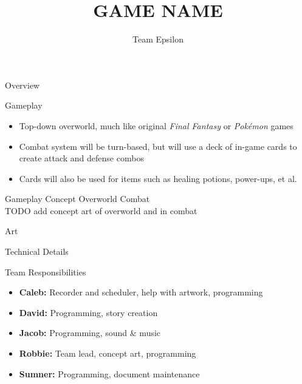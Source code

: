 \documentclass{teamepsilon}
\title{GAME NAME}
\author{Team Epsilon}
\institute{Colorado School of Mines}
\begin{document}
\begin{frame}{Overview}

\end{frame}

\begin{frame}{Gameplay}
    \begin{itemize}
        \item Top-down overworld, much like original \textit{Final Fantasy}
        or \textit{Pok\'emon} games
        \item Combat system will be turn-based, but will use a deck of in-game
        cards to create attack and defense combos
        \item Cards will also be used for items such as healing potions,
        power-ups, et al.
    \end{itemize}
\end{frame}

\begin{frame}{Gameplay Concept}
Overworld \hfill Combat \\
TODO add concept art of overworld and in combat
\end{frame}

\begin{frame}{Art}

\end{frame}

\begin{frame}{Technical Details}

\end{frame}

\begin{frame}{Team Responsibilities}
    \begin{itemize}
        \item \textbf{Caleb:} Recorder and scheduler, help with artwork,
        programming
        \item \textbf{David:} Programming, story creation
        \item \textbf{Jacob:} Programming, sound \& music
        \item \textbf{Robbie:} Team lead, concept art, programming
        \item \textbf{Sumner:} Programming, document maintenance
    \end{itemize}
\end{frame}
\end{document}
